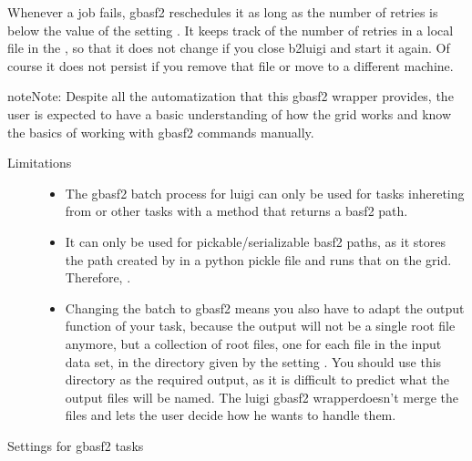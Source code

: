 \documentclass[letterpaper,10pt,english]{sphinxmanual}
\begin{document}
\begin{fulllineitems}
\begin{description}
\begin{itemize}
Whenever a job fails, gbasf2 reschedules it as long as the number of retries is below the
value of the setting . It keeps track of the number of retries in a
local file in the , so that it does not change if you close b2luigi and start it again.
Of course it does not persist if you remove that file or move to a different machine.

\end{itemize}

\end{description}

\begin{sphinxadmonition}{note}{Note:}
Despite all the automatization that this gbasf2 wrapper provides, the user is expected to
have a basic understanding of how the grid works and know the basics of working
with gbasf2 commands manually.
\end{sphinxadmonition}
\begin{description}
\item[{Limitations}] \leavevmode\begin{itemize}
\item {} 
The gbasf2 batch process for luigi can only be used for tasks
inhereting from  or other tasks with a
 method that returns a basf2 path.

\item {} 
It can only be used for pickable/serializable basf2 paths, as it stores
the path created by  in a python pickle file and runs that on the grid.
Therefore, .

\item {} 
Changing the batch to gbasf2 means you also have to adapt the output function of your task, because the
output will not be a single root file anymore, but a collection of root files,
one for each file in the input data set, in the directory given by the setting .
You should use this directory as the required output, as it is difficult to predict what the output
files will be named. The luigi gbasf2 wrapperdoesn’t merge the files and lets the user decide how he wants to
handle them.

\end{itemize}

\item[{Settings for gbasf2 tasks}] \leavevmode\begin{quote}


\end{quote}
\end{description}
\end{fulllineitems}
\end{document}
